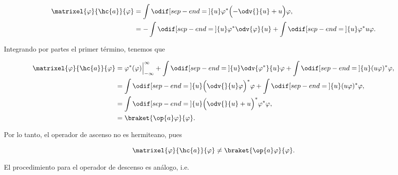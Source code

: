 \documentclass[../main.tex]{subfiles}
\begin{document}
\begin{problema}[30]
	\begin{align*}
		\matrixel{\varphi}{\hc{a}}{\varphi} & = \int \odif[sep-end=\medspace]{u} \varphi^{*}\Bigl(-\odv{}{u} + u\Bigr)\varphi,                                        \\
		                                    & = -\int \odif[sep-end=\medspace]{u} \varphi^{*}\odv{\varphi}{u} + \int \odif[sep-end=\medspace]{u} \varphi^{*}u\varphi.
	\end{align*}

	Integrando por partes el primer término, tenemos que

	\begin{align*}
		\matrixel{\varphi}{\hc{a}}{\varphi} & = \varphi^{*}(\varphi)\Bigr\rvert_{-\infty}^{\infty} +
		\int \odif[sep-end=\medspace]{u} \odv{\varphi^{*}}{u}\varphi + \int \odif[sep-end=\medspace]{u} (u\varphi)^{*}\varphi,    \\
		                                    & = \int \odif[sep-end=\medspace]{u} \Bigl(\odv{}{u}\varphi\Bigr)^{*}\varphi +
		\int \odif[sep-end=\medspace]{u} (u\varphi)^{*}\varphi,                                                                   \\
		                                    & = \int \odif[sep-end=\medspace]{u} \Bigl(\odv{}{u} + u\Bigr)^{*}\varphi^{*}\varphi, \\
		                                    & = \braket{\op{a}\varphi}{\varphi}.
	\end{align*}

	Por lo tanto, el operador de ascenso no es hermiteano, pues

	\begin{equation*}
		\matrixel{\varphi}{\hc{a}}{\varphi} \neq \braket{\op{a}\varphi}{\varphi}.
	\end{equation*}

	El procedimiento para el operador de descenso es análogo, i.e.


\end{problema}
\end{document}
